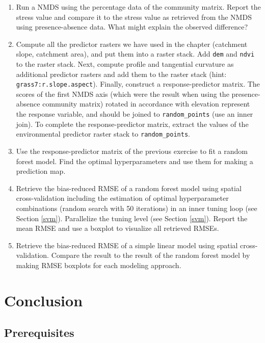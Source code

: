 \documentclass[]{krantz}
\begin{document}
\begin{enumerate}
\def\labelenumi{\arabic{enumi}.}
\item
  Run a NMDS using the percentage data of the community matrix.
  Report the stress value and compare it to the stress value as retrieved from the NMDS using presence-absence data.
  What might explain the observed difference?
\item
  Compute all the predictor rasters we have used in the chapter (catchment slope, catchment area), and put them into a raster stack.
  Add \texttt{dem} and \texttt{ndvi} to the raster stack.
  Next, compute profile and tangential curvature as additional predictor rasters and add them to the raster stack (hint: \texttt{grass7:r.slope.aspect}).
  Finally, construct a response-predictor matrix.
  The scores of the first NMDS axis (which were the result when using the presence-absence community matrix) rotated in accordance with elevation represent the response variable, and should be joined to \texttt{random\_points} (use an inner join).
  To complete the response-predictor matrix, extract the values of the environmental predictor raster stack to \texttt{random\_points}.
\item
  Use the response-predictor matrix of the previous exercise to fit a random forest model.
  Find the optimal hyperparameters and use them for making a prediction map.
\item
  Retrieve the bias-reduced RMSE of a random forest model using spatial cross-validation including the estimation of optimal hyperparameter combinations (random search with 50 iterations) in an inner tuning loop (see Section \ref{svm}).
  Parallelize the tuning level (see Section \ref{svm}).
  Report the mean RMSE and use a boxplot to visualize all retrieved RMSEs.
\item
  Retrieve the bias-reduced RMSE of a simple linear model using spatial cross-validation.
  Compare the result to the result of the random forest model by making RMSE boxplots for each modeling approach.
\end{enumerate}

\hypertarget{conclusion}{%
\section{Conclusion}\label{conclusion}}

\hypertarget{prerequisites-13}{%
\subsection*{Prerequisites}\label{prerequisites-13}}
\end{document}
